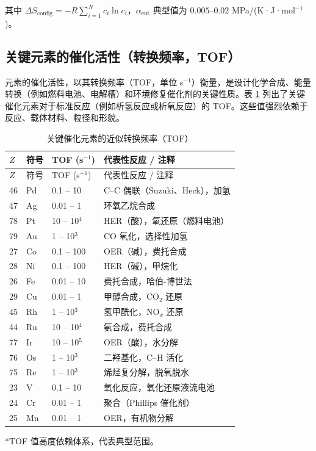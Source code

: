 \documentclass[12pt,a4paper]{article}
\begin{document}
	其中 \(\Delta S_{\text{config}} = -R \sum_{i=1}^{N} c_i \ln c_i\)，\(\alpha_{\text{ent}}\) 典型值为 \(0.005\)–\(0.02\) MPa/(K·J·mol\(^{-1}\))。
	
	\subsection{关键元素的催化活性（转换频率，TOF）}
	\label{subsec:catalytic-activity}
	
	元素的催化活性，以其转换频率（TOF，单位 s\(^{-1}\)）衡量，是设计化学合成、能量转换（例如燃料电池、电解槽）和环境修复催化剂的关键性质。表 \ref{tab:tof-data} 列出了关键催化元素对于标准反应（例如析氢反应或析氧反应）的 TOF。这些值强烈依赖于反应、载体材料、粒径和形貌。
	
	\begin{longtable}{p{1.2cm}p{1.2cm}p{3.0cm}p{6.5cm}}
		\caption{关键催化元素的近似转换频率（TOF）} \label{tab:tof-data} \\
		\toprule
		\(Z\) & 符号 & TOF (s\(^{-1}\)) & 代表性反应 / 注释 \\
		\midrule
		\endfirsthead
		\toprule
		\(Z\) & 符号 & TOF (s\(^{-1}\)) & 代表性反应 / 注释 \\
		\midrule
		\endhead
		46 & Pd & 0.1 – 10 & C–C 偶联（Suzuki、Heck），加氢 \\
		47 & Ag & 0.01 – 1 & 环氧乙烷合成 \\
		78 & Pt & 10 – 10\(^4\) & HER（酸），氧还原（燃料电池） \\
		79 & Au & 1 – 10\(^3\) & CO 氧化，选择性加氢 \\
		27 & Co & 0.1 – 100 & OER（碱），费托合成 \\
		28 & Ni & 0.1 – 100 & HER（碱），甲烷化 \\
		26 & Fe & 0.01 – 10 & 费托合成，哈伯-博世法 \\
		29 & Cu & 0.01 – 1 & 甲醇合成，CO\(_2\) 还原 \\
		45 & Rh & 1 – 10\(^3\) & 氢甲酰化，NO\(_x\) 还原 \\
		44 & Ru & 10 – 10\(^4\) & 氨合成，费托合成 \\
		77 & Ir & 10 – 10\(^5\) & OER（酸），水分解 \\
		76 & Os & 1 – 10\(^3\) & 二羟基化，C–H 活化 \\
		75 & Re & 1 – 10\(^3\) & 烯烃复分解，脱氧脱水 \\
		23 & V  & 0.1 – 10 & 氧化反应，氧化还原液流电池 \\
		24 & Cr & 0.01 – 1 & 聚合（Phillips 催化剂） \\
		25 & Mn & 0.01 – 1 & OER，有机物分解 \\
		\bottomrule
	\end{longtable}
	*TOF 值高度依赖体系，代表典型范围。
	
\end{document}

